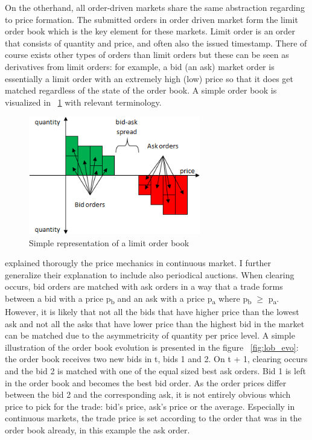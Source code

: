 On the otherhand, all order-driven markets share the same abstraction regarding
to price formation. The submitted orders in order driven market form the limit order 
book which is the key element for these markets. Limit order is an order that
consists of quantity and price, and often also the issued timestamp.
There of course exists other types of orders than limit orders but these can be seen as derivatives from limit
orders: for example, a bid (an ask) market order is essentially a limit order 
with an extremely high (low) price so that it does get matched regardless of the
state of the order book. \citep{lob13} A simple order book is visualized in ~\ref{fig:lob_repr}
with relevant terminology.

\begin{figure}
    \begin{center}  
        \includegraphics[width=7.5cm]{diagrams/lob_repr.png}
        \caption{Simple representation of a limit order book}
        \label{fig:lob_repr}
    \end{center}
\end{figure}

\citet{lob13} explained thorougly the price mechanics in continuous market. I 
further generalize their explanation to include also periodical auctions.
When clearing occurs, bid orders are matched with ask orders in a way that a 
trade forms between a bid with a price p\textsubscript{b} and an ask with a price 
p\textsubscript{a} where p\textsubscript{b} $\geq$ p\textsubscript{a}. However, it is likely
that not all the bids that have higher price than the lowest ask and not all the asks that
have lower price than the highest bid in the market can be matched due to the asymmetricity 
of quantity per price level. A simple illustration of the order book evolution is presented
in the figure ~\ref{fig:lob_evo}: the order book receives two new bids in t, bids 1 and 2.
On t + 1, clearing occurs and the bid 2 is matched with one of the equal sized best ask orders.
Bid 1 is left in the order book and becomes the best bid order. As the order prices differ
between the bid 2 and the corresponding ask, it is not entirely obvious which price to pick
for the trade: bid's price, ask's price or the average. Especially in continuous markets,
the trade price is set according to the order that was in the order book already, in this
example the ask order. %


